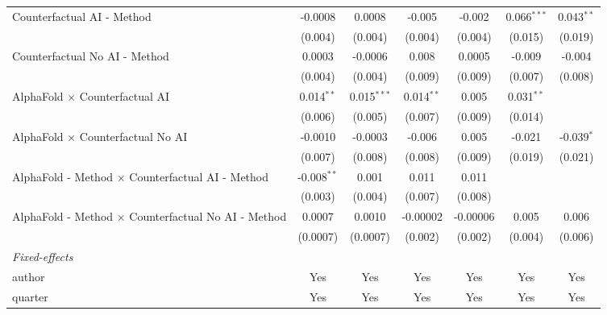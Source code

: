 \begin{tabular}{lcccccc}
   Counterfactual AI - Method                                 & -0.0008        & 0.0008         & -0.005       & -0.002   & 0.066$^{***}$ & 0.043$^{**}$\\   
                                                              & (0.004)        & (0.004)        & (0.004)      & (0.004)  & (0.015)       & (0.019)\\   
   Counterfactual No AI - Method                              & 0.0003         & -0.0006        & 0.008        & 0.0005   & -0.009        & -0.004\\   
                                                              & (0.004)        & (0.004)        & (0.009)      & (0.009)  & (0.007)       & (0.008)\\   
   AlphaFold $\times$ Counterfactual AI                       & 0.014$^{**}$   & 0.015$^{***}$  & 0.014$^{**}$ & 0.005    & 0.031$^{**}$  &   \\   
                                                              & (0.006)        & (0.005)        & (0.007)      & (0.009)  & (0.014)       &   \\   
   AlphaFold $\times$ Counterfactual No AI                    & -0.0010        & -0.0003        & -0.006       & 0.005    & -0.021        & -0.039$^{*}$\\   
                                                              & (0.007)        & (0.008)        & (0.008)      & (0.009)  & (0.019)       & (0.021)\\   
   AlphaFold - Method $\times$ Counterfactual AI - Method     & -0.008$^{**}$  & 0.001          & 0.011        & 0.011    &               &   \\   
                                                              & (0.003)        & (0.004)        & (0.007)      & (0.008)  &               &   \\   
   AlphaFold - Method $\times$ Counterfactual No AI - Method  & 0.0007         & 0.0010         & -0.00002     & -0.00006 & 0.005         & 0.006\\   
                                                              & (0.0007)       & (0.0007)       & (0.002)      & (0.002)  & (0.004)       & (0.006)\\   
   \midrule
   \emph{Fixed-effects}\\
   author                                                     & Yes            & Yes            & Yes          & Yes      & Yes           & Yes\\  
   quarter                                                    & Yes            & Yes            & Yes          & Yes      & Yes           & Yes\\  

\end{tabular}
